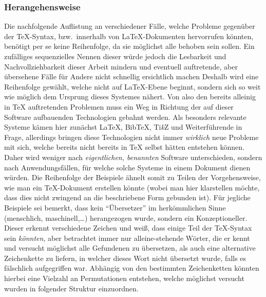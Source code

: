 \subsubsection*{Herangehensweise}
Die nachfolgende Auflistung an verschiedener Fälle, welche Probleme gegenüber der \TeX{}-Syntax, bzw.\ innerhalb von \LaTeX{}-Dokumenten hervorrufen könnten, benötigt per se keine Reihenfolge, da sie möglichst alle behoben sein sollen. Ein zufälliges sequenzielles Nennen dieser würde jedoch die Lesbarkeit und Nachvollziehbarkeit dieser Arbeit mindern und eventuell auftretende, aber übersehene Fälle für Andere nicht schnellig ersichtlich machen
Deshalb wird eine Reihenfolge gewählt, welche nicht auf \LaTeX{}-Ebene beginnt, sondern sich so weit wie möglich dem Ursprung dieses Systemes nähert. Von also den bereits alleinig in \TeX{} auftretenden Problemen muss ein Weg in Richtung der auf dieser Software aufbauenden Technologien gebahnt werden. Als besonders relevante Systeme kämen hier zunächst \LaTeX{}, Bib\TeX{}, Ti\textit{k}Z und Weiterführende in Frage, allerdings bringen diese Technologien nicht immer \textit{wirklich} neue Probleme mit sich, welche bereits nicht bereits in \TeX{} selbst hätten entstehen können. Daher wird weniger nach \textit{eigentlichen, benannten} Software unterschieden, sondern nach Anwendungsfällen, für welche solche Systeme in einem Dokument dienen würden. Die Reihenfolge der Beispiele ähnelt somit zu Teilen der Vorgehensweise, wie man ein \TeX{}-Dokument erstellen könnte (wobei man hier klarstellen möchte, dass dies nicht zwingend an die beschriebene Form gebunden ist).
Für jegliche Beispiele sei bemerkt, dass kein \enquote{Übersetzer} im herkömmlichen Sinne (menschlich, maschinell,\ldots) herangezogen wurde, sondern ein Konzeptioneller. Dieser erkennt verschiedene Zeichen und weiß, dass einige Teil der \TeX{}-Syntax sein \textit{könnten}, aber betrachtet immer nur alleine-stehende Wörter, die er kennt und versucht möglichst alle Gefundenen zu übersetzen, als auch eine alternative Zeichenkette zu liefern, in welcher dieses Wort nicht übersetzt wurde, falls es fälschlich aufgegriffen war. Abhängig von den bestimmten Zeichenketten könnten hierbei eine Vielzahl an Permutationen entstehen, welche möglichst versucht wurden in folgender Struktur einzuordnen.

